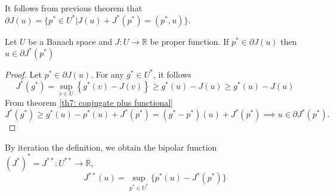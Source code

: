 \begin{corollary}
	It follows from previous theorem that $\partial J(u)=\lbrace p^* \in U^* | J(u)+J^*(p^*)=(p^*, u)\rbrace$.
\end{corollary}
\begin{theorem}
	Let $U$ be a Banach space and $J:U\rightarrow \mathbb{R}$ be proper function. If $p^* \in \partial J(u)$ then $u\in \partial J^* (p^*)$
	\begin{proof}
		Let $p^*\in \partial J(u)$. For any $g^* \in U^*$, it follows \[J^*(g^*)=\sup_{v\in U} \left\lbrace
		g^*(v)-J(v)\right\rbrace\geq g^*(u)-J(u)\geq g^*(u)-J(u)\]
		From theorem \ref{th7: conjugate plus functional} 
		\[
		J^*(g^*)\geq g^*(u)-p^*(u)+J^*(p^*) = \left(g^* - p^* \right)(u)+J^*(p^*)\implies u\in \partial J^*(p^*).
		\]
	\end{proof}
\end{theorem}
By iteration the definition, we obtain the bipolar function
$(J^*)^*=J^{**}: U^{**}\rightarrow \overline{\mathbb{R}}$, 
\[
	J^{**}(u)=\sup_{p^*\in U^*} \lbrace p^*(u)-J^*(p^*) \rbrace
\]

